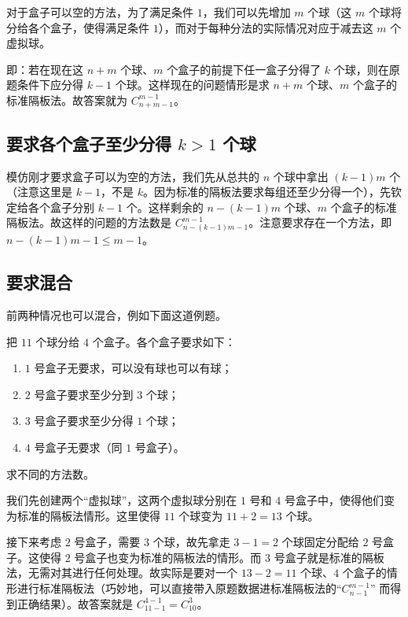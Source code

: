 
对于盒子可以空的方法，为了满足条件 $1$，我们可以先增加 $m$ 个球（这 $m$ 个球将分给各个盒子，使得满足条件 $1$），而对于每种分法的实际情况对应于减去这 $m$ 个虚拟球。

即：若在现在这 $n+m$ 个球、$m$ 个盒子的前提下任一盒子分得了 $k$ 个球，则在原题条件下应分得 $k-1$ 个球。这样现在的问题情形是求 $n+m$ 个球、$m$ 个盒子的标准隔板法。故答案就为 $C_{n+m-1}^{m-1}$。

\subsection{要求各个盒子至少分得 $k > 1$ 个球}
模仿刚才要求盒子可以为空的方法，我们先从总共的 $n$ 个球中拿出 $(k-1)m$ 个（注意这里是 $k-1$，不是 $k$。因为标准的隔板法要求每组还至少分得一个），先钦定给各个盒子分别 $k-1$ 个。这样剩余的 $n-(k-1)m$ 个球、$m$ 个盒子的标准隔板法。故这样的问题的方法数是 $C_{n-(k-1)m-1}^{m-1}$。注意要求存在一个方法，即 $n-(k-1)m-1 \le m-1$。

\subsection{要求混合}
前两种情况也可以混合，例如下面这道例题。
\begin{example}{}
把 $11$ 个球分给 $4$ 个盒子。各个盒子要求如下：
\begin{enumerate}
\item $1$ 号盒子无要求，可以没有球也可以有球；
\item $2$ 号盒子要求至少分到 $3$ 个球；
\item $3$ 号盒子要求至少分得 $1$ 个球；
\item $4$ 号盒子无要求（同 $1$ 号盒子）。
\end{enumerate}
求不同的方法数。
\end{example}
我们先创建两个“虚拟球”，这两个虚拟球分别在 $1$ 号和 $4$ 号盒子中，使得他们变为标准的隔板法情形。这里使得 $11$ 个球变为 $11+2 = 13$ 个球。

接下来考虑 $2$ 号盒子，需要 $3$ 个球，故先拿走 $3-1=2$ 个球固定分配给 $2$ 号盒子。这使得 $2$ 号盒子也变为标准的隔板法的情形。而 $3$ 号盒子就是标准的隔板法，无需对其进行任何处理。故实际是要对一个 $13-2=11$ 个球、$4$ 个盒子的情形进行标准隔板法（巧妙地，可以直接带入原题数据进标准隔板法的“$C_{n-1}^{m-1}$” 而得到正确结果）。故答案就是 $C_{11-1}^{4-1} = C_{10}^3$。